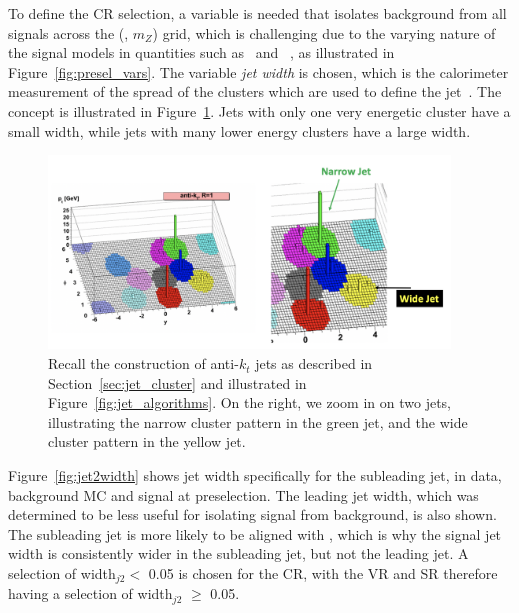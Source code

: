 To define the CR selection, a variable is needed that isolates background from all signals across the (\rinv, $m_Z$) grid, which is challenging due to the varying nature of the signal models in quantities such as \met~and \pt~, as illustrated in Figure~\ref{fig:presel_vars}. 
The variable \textit{jet width} is chosen, which is the calorimeter measurement of the spread of the clusters which are used to define the jet~\cite{jetwidth}.
The concept is illustrated in Figure~\ref{fig:jet2_calo}.
Jets with only one very energetic cluster have a small width, while jets with many lower energy clusters have a large width.
\begin{figure}[!htbp]
\centering
   \includegraphics[width=0.95\textwidth]{figures/eventsel/jet2_calo}
    \caption{Recall the construction of anti-$k_t$ jets as described in Section~\ref{sec:jet_cluster} and illustrated in Figure~\ref{fig:jet_algorithms}. On the right, we zoom in on two jets, illustrating the narrow cluster pattern in the green jet, and the wide cluster pattern in the yellow jet.
    \label{fig:jet2_calo}}
\end{figure}

Figure~\ref{fig:jet2width} shows jet width specifically for the subleading jet, in data, background MC and signal at preselection.
The leading jet width, which was determined to be less useful for isolating signal from background, is also shown.
The subleading jet is more likely to be aligned with \met, which is why the signal jet width is consistently wider in the subleading jet, but not the leading jet.  %
A selection of width$_{j2} <$ 0.05 is chosen for the CR, with the VR and SR therefore having a selection of width$_{j2}$ $\geq$ 0.05.
 
